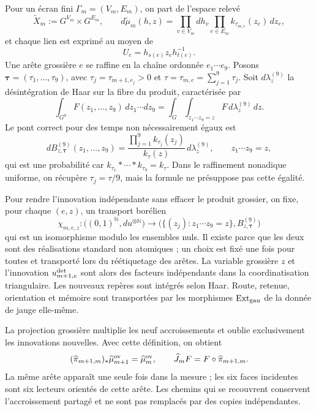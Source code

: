 Pour un écran fini $\Gamma_m=(V_m,E_m)$, on part de l'espace relevé
\begin{equation}\label{eq:pdf2-ym-owner-lifted-space}
 \widetilde X_m:=G^{V_m}\times G^{E_m},\qquad
 d\widetilde\mu_m(h,z)
 =\prod_{v\in V_m}dh_v\prod_{e\in E_m}k_{\tau_{m,e}}(z_e)\,dz_e,
\end{equation}
et chaque lien est exprimé au moyen de
\begin{equation}\label{eq:pdf2-ym-owner-link-publication}
 U_e=h_{s(e)}z_eh_{t(e)}^{-1}.
\end{equation}
Une arête grossière $e$ se raffine en la chaîne ordonnée $e_1\cdots e_9$. Posons \(\boldsymbol\tau=(\tau_1,\ldots,\tau_9)\), avec \(\tau_j=\tau_{m+1,e_j}>0\) et \(\tau=\tau_{m,e}=\sum_{j=1}^9\tau_j\). Soit \(d\lambda_z^{(9)}\) la désintégration de Haar sur la fibre du produit, caractérisée par
\[
 \int_{G^9}F(z_1,\ldots,z_9)\,dz_1\cdots dz_9
 =\int_G\int_{z_1\cdots z_9=z}
   F\,d\lambda_z^{(9)}\,dz.
\]
Le pont correct pour des temps non nécessairement égaux est
\begin{equation}\label{eq:pdf2-ym-owner-heat-bridge}
 dB_{z,\boldsymbol\tau}^{(9)}(z_1,\ldots,z_9)
 =\frac{\prod_{j=1}^9k_{\tau_j}(z_j)}{k_\tau(z)}
   \,d\lambda_z^{(9)},
 \qquad z_1\cdots z_9=z,
\end{equation}
qui est une probabilité car
\(k_{\tau_1}*\cdots*k_{\tau_9}=k_\tau\). Dans le raffinement nonadique uniforme, on
récupère \(\tau_j=\tau/9\), mais la formule ne présuppose pas cette égalité.

Pour rendre l'innovation indépendante sans effacer le produit grossier, on fixe, pour chaque $(e,z)$, un transport borélien
\begin{equation}\label{eq:pdf2-ym-owner-bridge-triangularization}
 \chi_{m,e,z}:\bigl((0,1)^{\mathbb N},du^{\otimes\mathbb N}\bigr)
 \longrightarrow
 \bigl(\{(z_j):z_1\cdots z_9=z\},B_{z,\boldsymbol\tau}^{(9)}\bigr)
\end{equation}
qui est un isomorphisme modulo les ensembles nuls. Il existe parce que les deux sont des réalisations standard non atomiques ; un choix est fixé une fois pour toutes et transporté lors du réétiquetage des arêtes. La variable grossière $z$ et l'innovation $u^{\rm det}_{m+1,e}$ sont alors des facteurs indépendants dans la coordinatisation triangulaire. Les nouveaux repères sont intégrés selon Haar. Route, retenue, orientation et mémoire sont transportées par les morphismes $\operatorname{Ext}_{\rm gau}$ de la donnée de jauge elle-même.

La projection grossière multiplie les neuf accroissements et oublie exclusivement les
innovations nouvelles. Avec cette définition, on obtient
\begin{equation}\label{eq:pdf2-ym-owner-projectivity}
 (\widehat\pi_{m+1,m})_*\widehat\mu_{m+1}^{\rm ov}
 =\widehat\mu_m^{\rm ov},\qquad
 \widehat J_mF=F\circ\widehat\pi_{m+1,m}.
\end{equation}
La même arête apparaît une seule fois dans la mesure ; les six faces incidentes sont six lecteurs orientés de cette arête. Les chemins qui se recouvrent conservent l'accroissement partagé et ne sont pas remplacés par des copies indépendantes.

